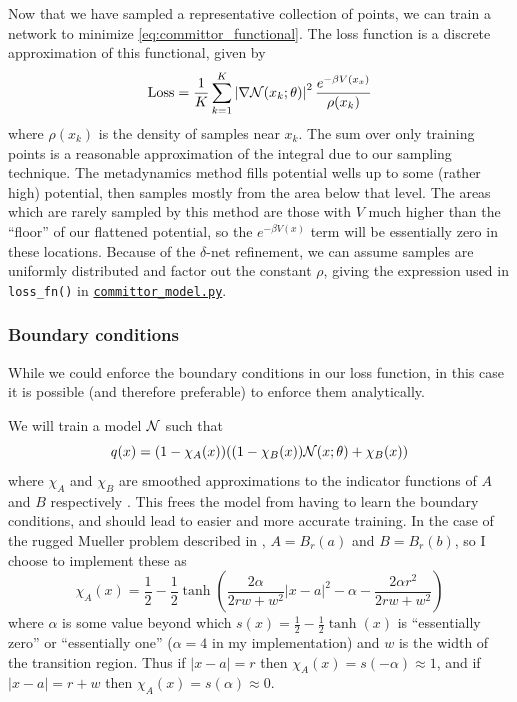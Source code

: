 \documentclass[12pt]{article}
\newcommand{\abs}[1]{\left\vert #1 \right\vert}
\theoremstyle{ColorTheorem}
\numberwithin{theorem}{section}
\numberwithin{corollary}{section}
\theoremstyle{ColorDefinition}
\theoremstyle{definition}
\theoremstyle{ColorRemark}
\numberwithin{equation}{section}
\begin{document}
Now that we have sampled a representative collection of points,
we can train a network to minimize \eqref{eq:committor_functional}.
The loss function is a discrete approximation of this functional, given by
\begin{equation}\label{eq:committor_loss}
  \operatorname{Loss} = \frac{1}{K} \sum_{k=1}^K \abs{\nabla \network(x_k ; \theta)}^2 \frac{e^{- \beta V(x_x)}}{\rho(x_k)}
\end{equation}
where \(\rho(x_k)\) is the density of samples near \(x_k\).
The sum over only training points is a reasonable approximation of the integral due to our sampling technique.
The metadynamics method fills potential wells up to some (rather high) potential, then samples mostly from the area below that level.
The areas which are rarely sampled by this method are those with \(V\) much higher than the ``floor'' of our flattened potential,
so the \(e^{-\beta V(x)}\) term will be essentially zero in these locations.
Because of the \(\delta\)-net refinement, we can assume samples are uniformly distributed and factor out the constant \(\rho\),
giving the expression used in \texttt{loss\_fn()} in 
\href{https://github.com/jrippeon/amsc665project2/blob/main/src/committor/committor_model.py}{\texttt{committor\_model.py}}.

\subsubsection{Boundary conditions}

While we could enforce the boundary conditions in our loss function,
in this case it is possible (and therefore preferable) to enforce them analytically.

We will train a model \(\mathcal{N}\) such that 
\begin{equation}\label{eq:committor_bc_model}
  q(x) = (1 - \chi_A(x)) ((1 - \chi_B(x)) \mathcal{N}(x; \theta) + \chi_B(x))
\end{equation}
where \(\chi_A\) and \(\chi_B\) are smoothed approximations to the indicator functions of \(A\) and \(B\) respectively \cite{li2019, cameron_nns4pdes}.
This frees the model from having to learn the boundary conditions, 
and should lead to easier and more accurate training.
In the case of the rugged Mueller problem described in \cite{yuan2024},
\(A = B_r(a)\) and \(B=B_r(b)\), so I choose to implement these as
\begin{equation}\label{eq:smooth_indicator}
  \chi_A(x) = \frac12 - \frac12 \tanh\left(
    \frac{2 \alpha}{2 r w + w^2} \abs{x - a}^2 - \alpha - \frac{2 \alpha r^2}{2 r w + w^2}
  \right)
\end{equation}
where \(\alpha\) is some value beyond which \(s(x) = \frac12 - \frac12 \tanh(x)\) is ``essentially zero'' or ``essentially one'' (\(\alpha = 4\) in my implementation)
and \(w\) is the width of the transition region. 
Thus if \(\abs{x-a} = r\) then \(\chi_A(x) = s(-\alpha) \approx 1\),
and if \(\abs{x-a} = r+w\) then \(\chi_A(x) = s(\alpha) \approx 0\).
\end{document}
